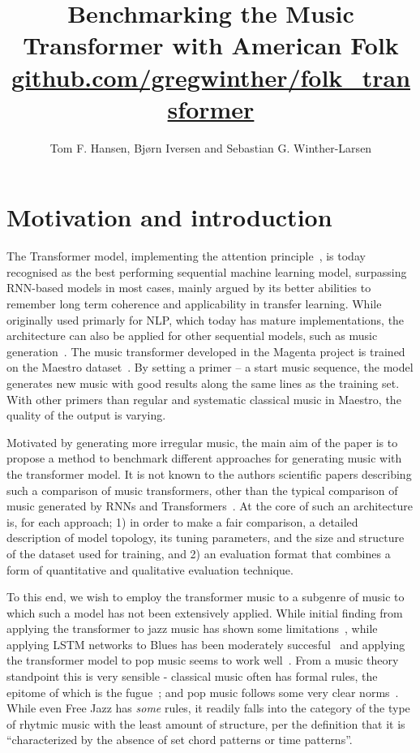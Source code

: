 \documentclass{article}
\title{Benchmarking the Music Transformer with American Folk \\
    \normalsize{\url{github.com/gregwinther/folk_transformer}}}
\author{Tom F. Hansen, Bjørn Iversen and Sebastian G. Winther-Larsen}
\begin{document}
    \maketitle

    \section{Motivation and introduction}

        The Transformer model, implementing the attention principle~\cite{vaswani2017attention},
        is today recognised as the best performing sequential machine learning model,
        surpassing RNN-based models in most cases, mainly argued by its better abilities
        to remember long term coherence and applicability in transfer learning.
        While originally used primarly for NLP, which today has mature implementations,
        the architecture can also be applied for other sequential models,
        such as music generation~\cite{huang2018music}.
        The music transformer developed in the Magenta project is trained on the Maestro
        dataset~\cite{maestrodataset}.
        By setting a primer – a start music sequence, the model generates new music with good
        results along the same lines as the training set. With other primers than regular and
        systematic classical music in Maestro, the quality of the output is varying.
        
        Motivated by generating more irregular music, the main aim of the paper is
        to propose a method to benchmark different approaches for generating music
        with the transformer model. It is not known to the authors scientific papers
        describing such a comparison of music transformers, other than the typical
        comparison of music generated by RNNs and Transformers~\cite{dai2019transformer}.
        At the core
        of such an architecture is, for each approach; 1) in order to make a fair comparison,
        a detailed description of model topology, its tuning parameters, and the size
        and structure of the dataset used for training, and 2) an evaluation format
        that combines a form of quantitative and qualitative evaluation technique.
       
        To this end, we wish to employ the transformer music to a subgenre of music 
        to which such a model has not been extensively applied.
        While initial finding from applying the transformer to jazz music has shown 
        some limitations~\cite{wu2020jazz}, while applying LSTM networks to Blues has 
        been moderately succesful~\cite{eck2002bluesLSTM} and applying the transformer 
        model to pop music seems to work well~\cite{huang2020pop}.
        From a music theory standpoint this is very sensible - classical music often has 
        formal rules, the epitome of which is the fugue~\cite{giraud2015computational};
        and pop music follows some very clear norms~\cite{hennion1983production}. While 
        even Free Jazz has \emph{some} rules, it readily falls into the category of the 
        type of rhytmic music with the least amount of structure, per the definition
        that it is ``characterized by the absence of set chord patterns or
        time patterns''\cite{FreeJazz}.
\end{document}
